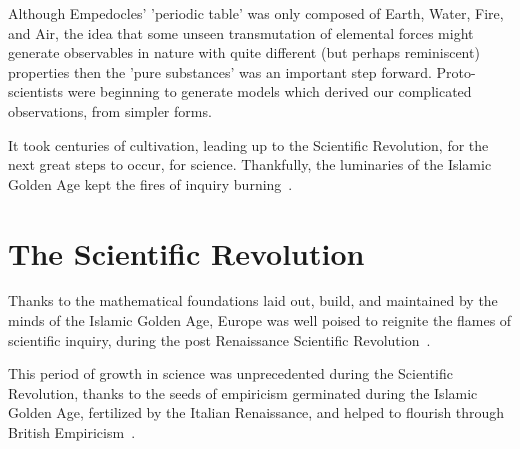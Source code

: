Although Empedocles' 'periodic table' was only composed of Earth, Water, Fire,
and Air, the idea that some unseen transmutation of elemental forces might
generate observables in nature with quite different (but perhaps reminiscent)
properties then the 'pure substances' was an important step forward.
Proto-scientists were beginning to generate models which derived our complicated
observations, from simpler forms.

It took centuries of cultivation, leading up to the Scientific Revolution, for
the next great steps to occur, for science. Thankfully, the luminaries of the
Islamic Golden Age kept the fires of inquiry burning~\cite{Alexakos2005}.

\clearpage
\section{The Scientific Revolution}

Thanks to the mathematical foundations laid out, build, and maintained by the
minds of the Islamic Golden Age, Europe was well poised to reignite the flames
of scientific inquiry, during the post Renaissance Scientific
Revolution~\cite{Alexakos2005}.

This period of growth in science was unprecedented during the Scientific
Revolution, thanks to the seeds of empiricism germinated during the Islamic
Golden Age, fertilized by the Italian Renaissance, and helped to flourish
through British Empiricism~\cite{Cowley1968}.

